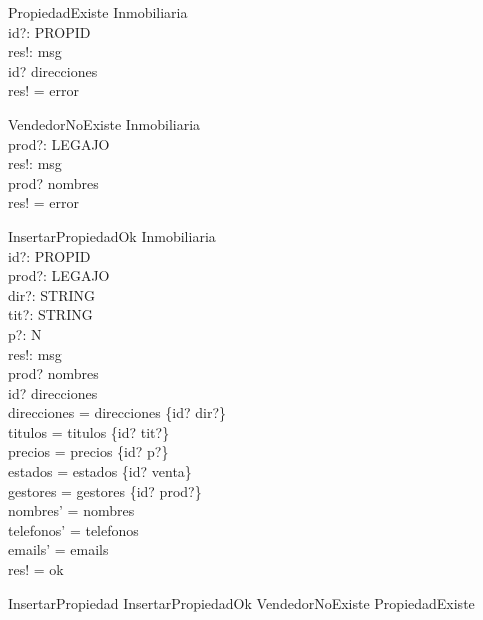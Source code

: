 \begin{schema}{PropiedadExiste}
\Xi Inmobiliaria \\
id?: PROPID \\
res!: msg \\
\where
id? \in \dom direcciones \\
res! = error \\
\end{schema}

\begin{schema}{VendedorNoExiste}
\Xi Inmobiliaria \\
prod?: LEGAJO \\
res!: msg \\
\where
prod? \notin \dom nombres \\
res! = error \\
\end{schema}

\begin{schema}{InsertarPropiedadOk}
\Delta Inmobiliaria \\
id?: PROPID \\
prod?: LEGAJO \\
dir?: STRING \\
tit?: STRING \\
p?: N \\
res!: msg \\
\where
prod? \in \dom nombres \\
id? \notin \dom direcciones \\
direcciones =  direcciones \cup \{id? \mapsto dir?\}  \\
titulos = titulos \cup \{id? \mapsto tit?\}  \\
precios = precios \cup \{id? \mapsto p?\}  \\
estados = estados \cup \{id? \mapsto venta\}  \\
gestores = gestores \cup \{id? \mapsto prod?\}  \\
nombres' =  nombres  \\
telefonos' =  telefonos  \\
emails' =  emails  \\

res! = ok \\
\end{schema}

\begin{zed}
InsertarPropiedad  InsertarPropiedadOk \lor VendedorNoExiste \lor PropiedadExiste
\end{zed}

